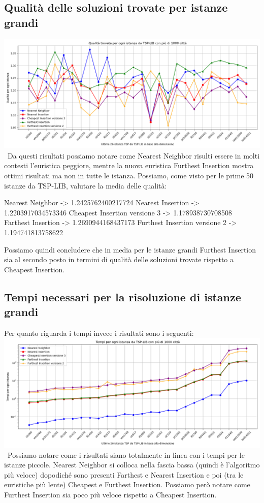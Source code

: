 \documentclass[a4paper,12pt]{report}
\begin{document}
\subsection{Qualità delle soluzioni trovate per istanze grandi}
\includegraphics[width=1\textwidth]{../Grafici/18.png} \
Da questi risultati possiamo notare come Nearest Neighbor risulti essere in molti contesti l'euristica peggiore, mentre la nuova euristica Furthest Insertion mostra ottimi risultati ma non in tutte le istanza. Possiamo, come visto per le prime 50 istanze da TSP-LIB, valutare la media delle qualità:
\begin{myverbatim}
Nearest Neighbor ->              1.2425762400217724
Nearest Insertion ->             1.2203917034573346
Cheapest Insertion versione 3 -> 1.178938730708508
Farthest Insertion ->            1.2690944168437173
Furthest Insertion versione 2 -> 1.194741813758622
\end{myverbatim}
Possiamo quindi concludere che in media per le istanze grandi Furthest Insertion sia al secondo posto in termini di qualità delle soluzioni trovate rispetto a Cheapest Insertion.
\subsection{Tempi necessari per la risoluzione di istanze grandi}
Per quanto riguarda i tempi invece i risultati sono i seguenti: \newline
\includegraphics[width=1\textwidth]{../Grafici/19.png} \
Possiamo notare come i risultati siano totalmente in linea con i tempi per le istanze piccole. Nearest Neighbor si colloca nella fascia bassa (quindi è l'algoritmo più veloce) dopodiché sono presenti Farthest e Nearest Insertion e poi (tra le euristiche più lente) Cheapest e Furthest Insertion. Possiamo però notare come Furthest Insertion sia poco più veloce rispetto a Cheapest Insertion.
\end{document}
